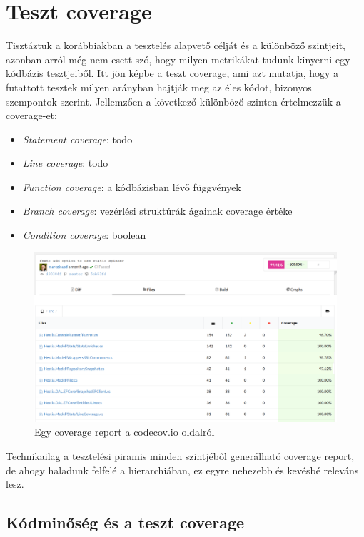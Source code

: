 \section{Teszt coverage}

Tisztáztuk a korábbiakban a tesztelés alapvető célját és a különböző szintjeit, azonban arról még nem esett szó, hogy milyen metrikákat tudunk kinyerni egy kódbázis tesztjeiből. Itt jön képbe a teszt coverage, ami azt mutatja, hogy a futattott tesztek milyen arányban hajtják meg az éles kódot, bizonyos szempontok szerint. Jellemzően a következő különböző szinten értelmezzük a coverage-et:
\begin{itemize}
    \item \textit{Statement coverage}: todo
    \item \textit{Line coverage}: todo
    \item \textit{Function coverage}: a kódbázisban lévő függvények
    \item \textit{Branch coverage}: vezérlési struktúrák ágainak coverage értéke
    \item \textit{Condition coverage}: boolean
\end{itemize}

\begin{figure}[H]
    \centering
    \includegraphics[width=1\textwidth]{images/codecov-report.png}
    \caption{Egy coverage report a codecov.io oldalról}
    \label{fig:codecov-example}
\end{figure}

Technikailag a tesztelési piramis minden szintjéből generálható coverage report, de ahogy haladunk felfelé a hierarchiában, ez egyre nehezebb és kevésbé releváns lesz.

\subsection{Kódminőség és a teszt coverage}

